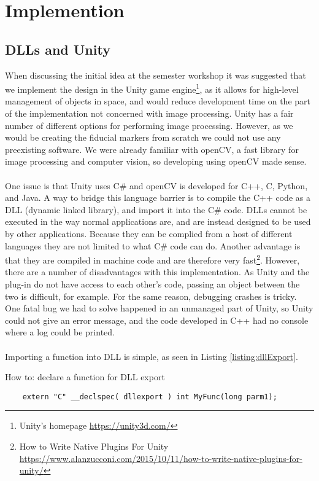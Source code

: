 \chapter{Implemention}
	\section{DLLs and Unity}
		When discussing the initial idea at the semester workshop it was suggested that we implement the design in the Unity game engine\footnote{Unity's homepage \url{https://unity3d.com/}}, as it allows for high-level management of objects in space, and would reduce development time on the part of the implementation not concerned with image processing. Unity has a fair number of different options for performing image processing. However, as we would be creating the fiducial markers from scratch we could not use any preexisting software. We were already familiar with openCV, a fast library for image processing and computer vision, so developing using openCV made sense.\\\\
		One issue is that Unity uses C\# and openCV is developed for C++, C, Python, and Java. A way to bridge this language barrier is to compile the C++ code as a DLL (dynamic linked library), and import it into the C\# code. DLLs  cannot be executed in the way normal applications are, and are instead designed to be used by other applications. Because they can be complied from a host of different languages they are not limited to what C\# code can do. Another advantage is that they are compiled in machine code and are therefore very fast\footnote{How to Write Native Plugins For Unity \url{https://www.alanzucconi.com/2015/10/11/how-to-write-native-plugins-for-unity/}}. However, there are a number of disadvantages with this implementation. As Unity and the plug-in do not have access to each other's code, passing an object between the two is difficult, for example. For the same reason, debugging crashes is tricky. One fatal bug we had to solve happened in an unmanaged part of Unity, so Unity could not give an error message, and the code developed in C++ had no console where a log could be printed.\\\\
		Importing a function into DLL is simple, as seen in Listing \ref{listing:dllExport}.
\begin{listing}[H]
	\caption{How to: declare a function for DLL export}
	\label{listing:dllExport}
	\begin{verbatim}
	extern "C" __declspec( dllexport ) int MyFunc(long parm1);
	\end{verbatim}
\end{listing}
